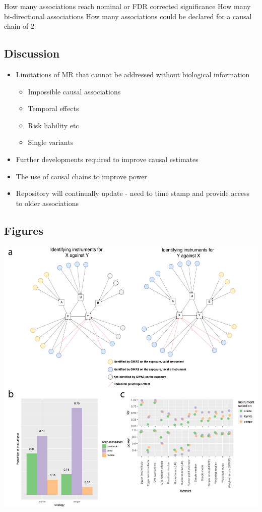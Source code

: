 \documentclass[]{article}
\providecommand{\tightlist}{%
  \setlength{\itemsep}{0pt}\setlength{\parskip}{0pt}}
\begin{document}
How many associations reach nominal or FDR corrected significance How
many bi-directional associations How many associations could be declared
for a causal chain of 2

\subsection{Discussion}\label{discussion}

\begin{itemize}
\tightlist
\item
  Limitations of MR that cannot be addressed without biological
  information

  \begin{itemize}
  \tightlist
  \item
    Impossible causal associations
  \item
    Temporal effects
  \item
    Risk liability etc
  \item
    Single variants
  \end{itemize}
\item
  Further developments required to improve causal estimates
\item
  The use of causal chains to improve power
\item
  Repository will continually update - need to time stamp and provide
  access to older associations
\end{itemize}

\subsection{Figures}\label{figures}

\newpage

\includegraphics{images/fig1.pdf}
\end{document}
